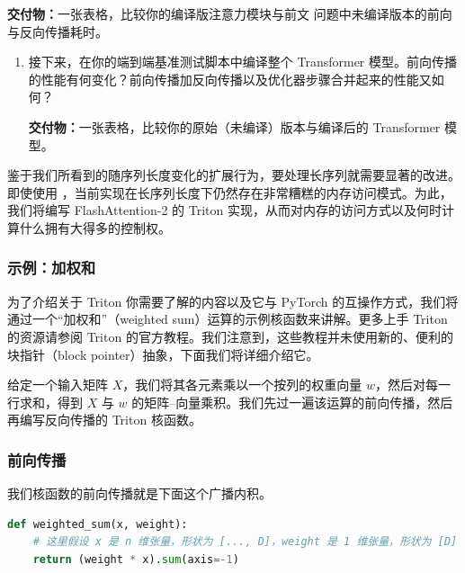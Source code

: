 
\textbf{交付物：}一张表格，比较你的编译版注意力模块与前文  问题中未编译版本的前向与反向传播耗时。

\begin{enumerate}[label=(\alph*), start=2]
  \item 接下来，在你的端到端基准测试脚本中编译整个 Transformer 模型。前向传播的性能有何变化？前向传播加反向传播以及优化器步骤合并起来的性能又如何？

  \textbf{交付物：}一张表格，比较你的原始（未编译）版本与编译后的 Transformer 模型。
\end{enumerate}

鉴于我们所看到的随序列长度变化的扩展行为，要处理长序列就需要显著的改进。即使使用 ，当前实现在长序列长度下仍然存在非常糟糕的内存访问模式。为此，我们将编写 FlashAttention-2 的 Triton 实现，从而对内存的访问方式以及何时计算什么拥有大得多的控制权。

\subsubsection{示例：加权和}

为了介绍关于 Triton 你需要了解的内容以及它与 PyTorch 的互操作方式，我们将通过一个“加权和”（weighted sum）运算的示例核函数来讲解。更多上手 Triton 的资源请参阅 Triton 的官方教程。我们注意到，这些教程并未使用新的、便利的块指针（block pointer）抽象，下面我们将详细介绍它。

给定一个输入矩阵 $X$，我们将其各元素乘以一个按列的权重向量 $w$，然后对每一行求和，得到 $X$ 与 $w$ 的矩阵--向量乘积。我们先过一遍该运算的前向传播，然后再编写反向传播的 Triton 核函数。

\subsubsection*{前向传播}

我们核函数的前向传播就是下面这个广播内积。

\begin{lstlisting}[language=Python]
def weighted_sum(x, weight):
    # 这里假设 x 是 n 维张量，形状为 [..., D]，weight 是 1 维张量，形状为 [D]
    return (weight * x).sum(axis=-1)
\end{lstlisting}

